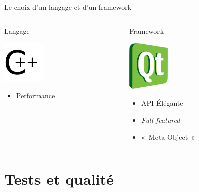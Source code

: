 \documentclass[frenchb]{beamer}
\begin{document}
\begin{frame}{Le choix d'un langage et d'un framework}
    \pause
    \begin{columns}
        \begin{column}[l]{5cm}
            \begin{block}{Langage}
            \begin{center}
                \includegraphics[width=2cm]{../img/ps/C_plus_plus.pdf}
            \end{center}
            \begin{itemize}
                \item Performance
            \end{itemize}
            \end{block}
        \end{column}
        \pause
        \begin{column}[r]{5cm}
            \begin{block}{Framework}
            \begin{center}
                \includegraphics[width=2cm]{../img/ps/Qt.pdf}
            \end{center}
            \begin{itemize}
                \item API Élégante
                \item \textit{Full featured}
                \item «~Meta Object~»
            \end{itemize}
            \end{block}
        \end{column}
    \end{columns}
\end{frame}

\section{Tests et qualité}
\end{document}
